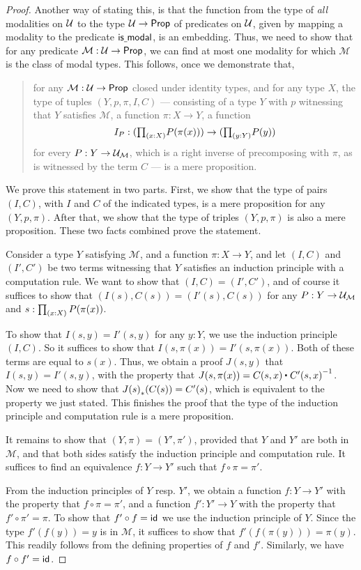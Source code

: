 \begin{proof}
Another way of stating this, is that the function from the type of \emph{all}
modalities on $\mathcal{U}$ to the type $\mathcal{U}\to\mathsf{Prop}$ of predicates on $\mathcal{U}$, given
by mapping a modality to the predicate $\mathsf{is\underline{\ }{}modal}$, is an embedding. Thus, we
need to show that for any predicate $\mathcal{M}:\mathcal{U}\to\mathsf{Prop}$, we can find at
most one modality for which $\mathcal{M}$ is the class of modal types. This
follows, once we demonstrate that,
\begin{quote}
for any $\mathcal{M}:\mathcal{U}\to\mathsf{Prop}$ closed under identity types,
and for any type $X$, the type of tuples $(Y,p,\pi,I,C)$ ---
consisting of a type $Y$ with $p$ witnessing that $Y$
satisfies $\mathcal{M}$, a function $\pi:X\to Y$, a function
\begin{equation*}
I_P:(\prd{x:X} P(\pi(x)))\to(\prd{y:Y} P(y))
\end{equation*}
for every $P:Y\to\mathcal{U}_{\mathcal{M}}$,
which is a right inverse of precomposing with $\pi$, as is witnessed by the
term $C$ --- is a mere proposition.
\end{quote}

We prove this statement in two parts. First, we show that the
type of pairs $(I,C)$, with $I$ and $C$ of the indicated types, is a mere
proposition for any $(Y,p,\pi)$. After that, we show that the type of triples
$(Y,p,\pi)$ is also a mere proposition. These two facts combined prove the
statement.

Consider a type $Y$ satisfying $\mathcal{M}$, and a function $\pi:X\to Y$, and
let $(I,C)$ and $(I',C')$ be two terms witnessing that $Y$ satisfies an induction
principle with a computation rule. We want to show that $(I,C)=(I',C')$, and of
course it suffices to show that $(I(s),C(s))=(I'(s),C(s))$ for any
$P:Y\to\mathcal{U}_{\mathcal{M}}$ and $s:\prd{x:X}P(\pi(x))$.

To show that $I(s,y)=I'(s,y)$ for any $y:Y$, we use
the induction principle $(I,C)$. So it suffices to show that
$I(s,\pi(x))=I'(s,\pi(x))$. Both of these terms are equal to $s(x)$. Thus,
we obtain a proof $J(s,y)$ that $I(s,y)=I'(s,y)$, with the property that
$J(s,\pi(x))=\ct{C(s,x)}{\inv{C'(s,x)}}$.
Now we need to show that ${J(s)}_{*}\mathopen{}\left({C(s)}\right)\mathclose{}=C'(s)$, which is equivalent
to the property we just stated. This finishes the proof that the type of
the induction principle and computation rule is a mere proposition.

It remains to show that $(Y,\pi)=(Y',\pi')$, provided that $Y$ and $Y'$ are both
in $\mathcal{M}$, and that both sides satisfy
the induction principle and computation rule. It suffices to find an equivalence
$f:Y\to Y'$ such that $f\circ \pi=\pi'$.

From the induction principles of $Y$ resp. $Y'$, we obtain a function
$f:Y\to Y'$ with the property that $f\circ \pi=\pi'$, and a function
$f':Y'\to Y$ with the property that $f'\circ \pi'=\pi$.
To show that $f'\circ f=\mathsf{id}_{}$ we use the induction principle
of $Y$. Since the type $f'(f(y))=y$ is in $\mathcal{M}$, it suffices to show that
$f'(f(\pi(y)))=\pi(y)$. This readily follows from the defining properties of $f$
and $f'$. Similarly, we have $f\circ f'=\mathsf{id}_{}$.
\end{proof}

